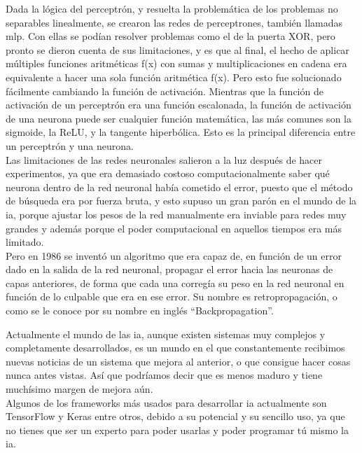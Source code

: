 Dada la lógica del perceptrón, y resuelta la problemática de los problemas no separables linealmente, se crearon las redes de perceptrones, también llamadas \gls{mlp}. Con ellas se podían resolver problemas como el de la puerta XOR, pero pronto se dieron cuenta de sus limitaciones, y es que al final, el hecho de aplicar múltiples funciones aritméticas f(x) con sumas y multiplicaciones en cadena era equivalente a hacer una sola función aritmética f(x). Pero esto fue solucionado fácilmente cambiando la función de activación. Mientras que la función de activación de un perceptrón era una función escalonada, la función de activación de una neurona puede ser cualquier función matemática, las más comunes son la sigmoide, la ReLU, y la tangente hiperbólica. Esto es la principal diferencia entre un perceptrón y una neurona.
\\
Las limitaciones de las redes neuronales salieron a la luz después de hacer experimentos, ya que era demasiado costoso computacionalmente saber qué neurona dentro de la red neuronal había cometido el error, puesto que el método de búsqueda era por fuerza bruta, y esto supuso un gran parón en el mundo de la \gls{ia}, porque ajustar los pesos de la red manualmente era inviable para redes muy grandes y además porque el poder computacional en aquellos tiempos era más limitado.
\\
Pero en 1986 se inventó un algoritmo que era capaz de, en función de un error dado en la salida de la red neuronal, propagar el error hacia las neuronas de capas anteriores, de forma que cada una corregía su peso en la red neuronal en función de lo culpable que era en ese error. Su nombre es retropropagación, o como se le conoce por su nombre en inglés ``Backpropagation''. 

Actualmente el mundo de las \gls{ia}, aunque existen sistemas muy complejos y completamente desarrollados, es un mundo en el que constantemente recibimos nuevas noticias de un sistema que mejora al anterior, o que consigue hacer cosas nunca antes vistas. Así que podríamos decir que es menos maduro y tiene muchísimo margen de mejora aún.
\\
Algunos de los frameworks más usados para desarrollar \gls{ia} actualmente son TensorFlow y Keras entre otros, debido a su potencial y su sencillo uso, ya que no tienes que ser un experto para poder usarlas y poder programar tú mismo la \gls{ia}.

